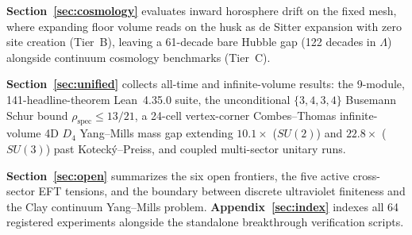 \textbf{Section~\ref{sec:cosmology}} evaluates inward horosphere drift on the fixed mesh, where expanding floor volume
reads on the husk as de Sitter expansion with zero site creation (Tier~B), leaving a 61-decade bare Hubble gap
(122 decades in $\Lambda$) alongside continuum cosmology benchmarks (Tier~C).

\textbf{Section~\ref{sec:unified}} collects all-time and infinite-volume results: the 9-module, 141-headline-theorem
Lean~4.35.0 suite, the unconditional $\{3,4,3,4\}$ Busemann Schur bound $\rho_{\mathrm{spec}} \le 13/21$, a 24-cell
vertex-corner Combes--Thomas infinite-volume 4D $D_4$ Yang--Mills mass gap extending $10.1\times$ ($SU(2)$) and
$22.8\times$ ($SU(3)$) past Koteck\'y--Preiss, and coupled multi-sector unitary runs.

\textbf{Section~\ref{sec:open}} summarizes the six open frontiers, the five active cross-sector EFT tensions, and the
boundary between discrete ultraviolet finiteness and the Clay continuum Yang--Mills problem. \textbf{Appendix~\ref{sec:index}}
indexes all 64 registered experiments alongside the standalone breakthrough verification scripts.
